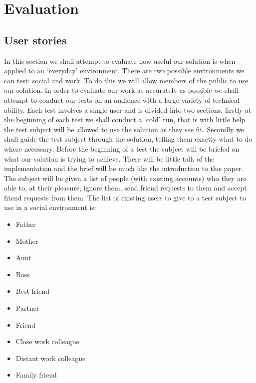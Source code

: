 \documentclass[12pt, titlepage]{article}
\begin{document}
\newpage
\section{Evaluation}

\subsection{User stories}
In this section we shall attempt to evaluate how useful our solution is when applied to an `everyday' environment. There are two possible environments we can test: social and work. To do this we will allow members of the public to use our solution. In order to evaluate our work as accurately as possible we shall attempt to conduct our tests on an audience with a large variety of technical ability.
\newline \indent Each test involves a single user and is divided into two sections: firstly at the beginning of each test we shall conduct a `cold' run, that is with little help the test subject will be allowed to use the solution as they see fit. Secondly we shall guide the test subject through the solution, telling them exactly what to do where necessary.
\newline \indent Before the beginning of a test the subject will be briefed on what our solution is trying to achieve. There will be little talk of the implementation and the brief will be much like the introduction to this paper. The subject will be given a list of people (with existing accounts) who they are able to, at their pleasure, ignore them, send friend requests to them and accept friend requests from them.
\newline The list of existing users to give to a test subject to use in a social environment is:
\begin{itemize}
	\item Father
	\item Mother
	\item Aunt
	\item Boss
	\item Best friend
	\item Partner
	\item Friend
	\item Close work colleague
	\item Distant work colleague
	\item Family friend	
\end{itemize}
\end{document}
